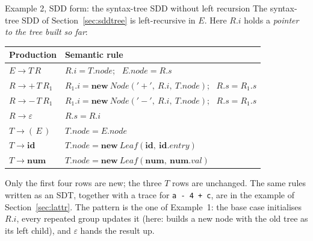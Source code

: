 \documentclass[11pt,a4paper]{article}
\newcommand{\at}[2]{\ensuremath{#1.\mathit{#2}}}
\newcommand{\tok}[1]{\ensuremath{\mathtt{#1}}}
\begin{document}
\begin{examplebox}{Example 2, SDD form: the syntax-tree SDD without left recursion}
The syntax-tree SDD of Section~\ref{sec:sddtree} is left-recursive in $E$. Here $\at{R}{i}$ holds a \emph{pointer to the tree built so far}:
\begin{center}
\small
\begin{tabular}{@{}l l@{}}
\toprule
\textbf{Production} & \textbf{Semantic rule} \\ \midrule
$E \to T\,R$        & $\at{R}{i}=\at{T}{node}$; \ $\at{E}{node}=\at{R}{s}$ \\
$R \to +\,T\,R_1$   & $\at{R_1}{i}=\mathbf{new}\ \mathit{Node}(\tok{'+'},\ \at{R}{i},\ \at{T}{node})$; \ $\at{R}{s}=\at{R_1}{s}$ \\
$R \to -\,T\,R_1$   & $\at{R_1}{i}=\mathbf{new}\ \mathit{Node}(\tok{'-'},\ \at{R}{i},\ \at{T}{node})$; \ $\at{R}{s}=\at{R_1}{s}$ \\
$R \to \varepsilon$ & $\at{R}{s}=\at{R}{i}$ \\
$T \to (\,E\,)$     & $\at{T}{node}=\at{E}{node}$ \\
$T \to \mathbf{id}$ & $\at{T}{node}=\mathbf{new}\ \mathit{Leaf}(\mathbf{id},\ \at{\mathbf{id}}{entry})$ \\
$T \to \mathbf{num}$ & $\at{T}{node}=\mathbf{new}\ \mathit{Leaf}(\mathbf{num},\ \at{\mathbf{num}}{val})$ \\ \bottomrule
\end{tabular}
\end{center}
Only the first four rows are new; the three $T$ rows are unchanged. The same rules written as an SDT, together with a trace for \texttt{a - 4 + c}, are in the example of Section~\ref{sec:lattr}. The pattern is the one of Example~1: the base case initialises $R.i$, every repeated group updates it (here: builds a new node with the old tree as its left child), and $\varepsilon$ hands the result up.
\end{examplebox}
\end{document}
